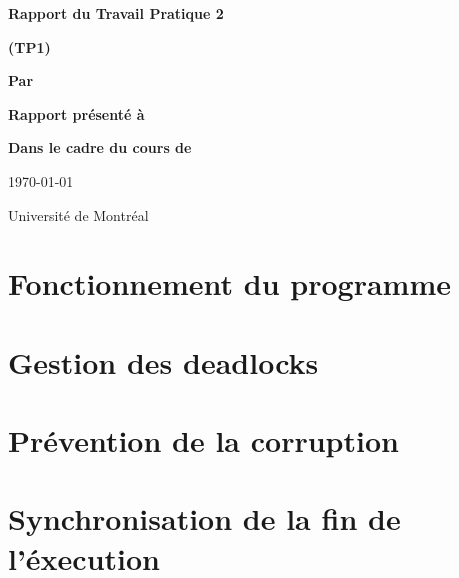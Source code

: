 \documentclass[letterpaper,12pt]{scrartcl}
\begin{document}
	\begin{center}
		\vspace{2cm}

		{\Huge\bf\sf Rapport du Travail Pratique 2}

		\vspace{0.5cm}

		{\bf\sf (TP1)}

		\vspace{4cm}

		{\bf\sf Par}

		\vspace{0.5cm}{\large\bf\sf Charles Langlois et François Poitras}

		\vspace{2cm}

		{\bf\sf Rapport présenté à}

		\vspace{0.5cm}{\large\bf\sf M. Stefan Monnier}

		\vspace{2cm}

		{\bf\sf Dans le cadre du cours de}

		\vspace{0.5cm}{\large\bf\sf Systèmes d'exploitation (IFT2245)}

		\vspace{\fill}
		\today

		\vspace{0.5cm}Université de Montréal
	\end{center}
	
	\newpage

	\pagestyle{cb}
	
	\tableofcontents

	\newpage
\section{Fonctionnement du programme}
\section{Gestion des deadlocks}
\section{Prévention de la corruption}
\section{Synchronisation de la fin de l'éxecution}
\end{document}
